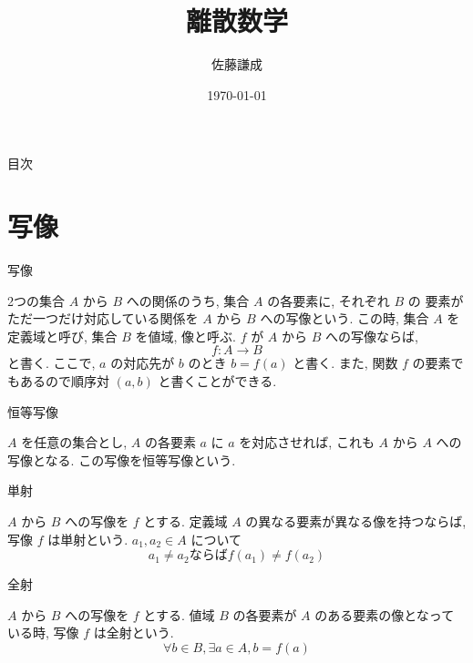 \documentclass[8pt, jfont=ipaexm]{beamer} %
\title{離散数学}
\author{佐藤謙成}
\date{\today}
\begin{document}
\maketitle

\begin{frame}{目次}
    \tableofcontents
\end{frame}

\section{写像}

\begin{frame}{写像}
    \begin{block}{}
        2つの集合 $A$ から $B$ への関係のうち, 集合 $A$ の各要素に, それぞれ $B$ の
        要素がただ一つだけ対応している関係を $A$ から $B$ への写像という. この時, 集合 $A$ を定義域と呼び, 集合 $B$ を値域, 像と呼ぶ. $f$ が $A$ から $B$ への写像ならば,
        \begin{equation*}
            f : A \to B
        \end{equation*}
        と書く. ここで, $a$ の対応先が $b$ のとき $b = f(a)$ と書く. また, 関数 $f$ の要素でもあるので順序対 $(a, b)$ と書くことができる.
    \end{block}
\end{frame}

\begin{frame}{恒等写像}
    \begin{block}{}
        $A$ を任意の集合とし, $A$ の各要素 $a$ に $a$ を対応させれば, これも $A$ から $A$ への写像となる. この写像を恒等写像という.
    \end{block}
\end{frame}

\begin{frame}{単射}
    \begin{block}{}
        $A$ から $B$ への写像を $f$ とする. 定義域 $A$ の異なる要素が異なる像を持つならば, 写像 $f$ は単射という. $a_1, a_2 \in A$ について
        \begin{equation*}
            a_1 \neq a_2 \text{ならば} f(a_1) \neq f(a_2)
        \end{equation*}
    \end{block}
\end{frame}

\begin{frame}{全射}
    \begin{block}{}
        $A$ から $B$ への写像を $f$ とする.
        値域 $B$ の各要素が $A$ のある要素の像となっている時, 写像 $f$ は全射という.
        \begin{equation}
            \forall b \in B, \exists a \in A, b = f(a)
        \end{equation}
    \end{block}
\end{frame}
\end{document}
